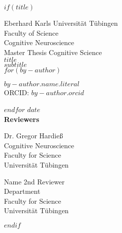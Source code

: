 $if(title)$
{
\centering
\huge Eberhard Karls Universität Tübingen \\
\Large Faculty of Science \\
\Large Cognitive Neuroscience \\
\vspace{10ex}
\huge Master Thesis Cognitive Science\\
\vspace{3ex}
\huge\textbf{$title$}\\
\huge $subtitle$\\
\vspace{3ex}
$for(by-author)$
\begin{center}
\Large $by-author.name.literal$\\
\large ORCID: \href{https://orcid.org/$by-author.orcid$}{$by-author.orcid$}
\end{center}
$endfor$
\vspace{3ex}
\Large $date$\\
\vspace{10ex}
\Large\textbf{Reviewers}\\
\vspace{3ex}
\parbox{0.5\textwidth}{
	\begin{center}
		{\Large Dr. Gregor Hardieß}\\
		\large Cognitive Neuroscience\\
		Faculty for Science\\
		Universität Tübingen
	\end{center}}
\hfill
\parbox{0.5\textwidth}{
	\begin{center}
  		{\Large Name 2nd Reviewer}\\
  		\large Department\\
  		Faculty for Science\\
  		Universität Tübingen
  	\end{center}
 }
}
$endif$